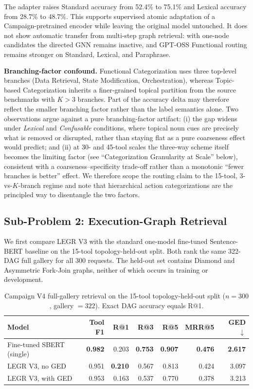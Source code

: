 \documentclass{article}
\begin{document}
The adapter raises Standard accuracy from 52.4\% to 75.1\% and Lexical accuracy from 28.7\% to 48.7\%. This supports supervised atomic adaptation of a Campaign-pretrained encoder while leaving the original model untouched. It does not show automatic transfer from multi-step graph retrieval: with one-node candidates the directed GNN remains inactive, and GPT-OSS Functional routing remains stronger on Standard, Lexical, and Paraphrase.

\textbf{Branching-factor confound.} Functional Categorization uses three top-level branches (Data Retrieval, State Modification, Orchestration), whereas Topic-based Categorization inherits a finer-grained topical partition from the source benchmarks with $K>3$ branches. Part of the accuracy delta may therefore reflect the smaller branching factor rather than the label semantics alone. Two observations argue against a pure branching-factor artifact: (i) the gap widens under \textit{Lexical} and \textit{Confusable} conditions, where topical noun cues are precisely what is removed or disrupted, rather than staying flat as a pure coarseness effect would predict; and (ii) at 30- and 45-tool scales the three-way scheme itself becomes the limiting factor (see ``Categorization Granularity at Scale'' below), consistent with a coarseness--specificity trade-off rather than a monotonic ``fewer branches is better'' effect. We therefore scope the routing claim to the 15-tool, 3-vs-$K$-branch regime and note that hierarchical action categorizations are the principled way to disentangle the two factors.

\subsection{Sub-Problem 2: Execution-Graph Retrieval}
\label{sec:results-legr}
We first compare LEGR V3 with the standard one-model fine-tuned Sentence-BERT baseline on the 15-tool topology-held-out split. Both rank the same 322-DAG full gallery for all 300 requests. The held-out set contains Diamond and Asymmetric Fork-Join graphs, neither of which occurs in training or development.

\begin{table}[h]
\caption{Campaign V4 full-gallery retrieval on the 15-tool topology-held-out split ($n=300$, gallery $=322$). Exact DAG accuracy equals R@1.}
\label{tab:retrieval_metrics}
\centering
\small
\begin{tabular}{@{}lrrrrrr@{}}
\toprule
Model & Tool F1 & R@1 & R@3 & R@5 & MRR@5 & GED $\downarrow$ \\
\midrule
Fine-tuned SBERT (single) & \textbf{0.982} & 0.203 & \textbf{0.753} & \textbf{0.907} & \textbf{0.476} & \textbf{2.617} \\
LEGR V3, no GED & 0.951 & \textbf{0.210} & 0.567 & 0.813 & 0.424 & 3.097 \\
LEGR V3, with GED & 0.953 & 0.163 & 0.537 & 0.770 & 0.378 & 3.213 \\
\bottomrule
\end{tabular}
\end{table}
\end{document}
